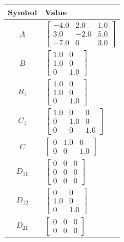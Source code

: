 \begin{tabular}{cl}
\hline
  Symbol  & Value                                                                                       \\
\hline
   $A$    & $\left[\begin{matrix}-4.0 & 2.0 & 1.0\\3.0 & -2.0 & 5.0\\-7.0 & 0 & 3.0\end{matrix}\right]$ \\
   $B$    & $\left[\begin{matrix}1.0 & 0\\1.0 & 0\\0 & 1.0\end{matrix}\right]$                          \\
 $B_{1}$  & $\left[\begin{matrix}1.0 & 0\\1.0 & 0\\0 & 1.0\end{matrix}\right]$                          \\
 $C_{1}$  & $\left[\begin{matrix}1.0 & 0 & 0\\0 & 1.0 & 0\\0 & 0 & 1.0\end{matrix}\right]$              \\
   $C$    & $\left[\begin{matrix}0 & 1.0 & 0\\0 & 0 & 1.0\end{matrix}\right]$                           \\
 $D_{11}$ & $\left[\begin{matrix}0 & 0 & 0\\0 & 0 & 0\\0 & 0 & 0\end{matrix}\right]$                    \\
 $D_{12}$ & $\left[\begin{matrix}0 & 0\\1.0 & 0\\0 & 1.0\end{matrix}\right]$                            \\
 $D_{21}$ & $\left[\begin{matrix}0 & 0 & 0\\0 & 0 & 0\end{matrix}\right]$                               \\
\hline
\end{tabular}